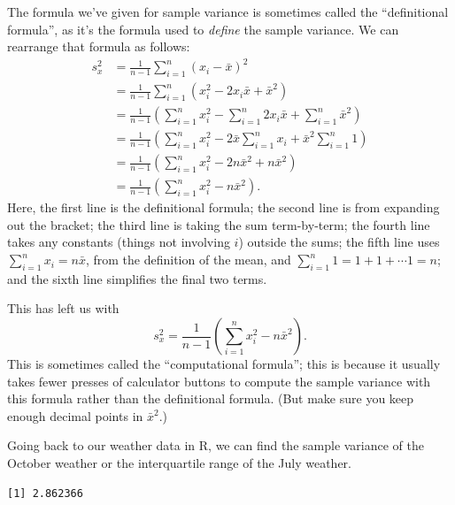 \documentclass[
  a4paper,
]{book}
\newenvironment{Shaded}{\begin{snugshade}}{\end{snugshade}}
\newcommand{\FunctionTok}[1]{\textcolor[rgb]{0.00,0.00,0.00}{#1}}
\newcommand{\NormalTok}[1]{#1}
\newcommand{\SpecialCharTok}[1]{\textcolor[rgb]{0.00,0.00,0.00}{#1}}
\theoremstyle{definition}
\theoremstyle{definition}
\theoremstyle{definition}
\theoremstyle{definition}
\theoremstyle{remark}
\begin{document}
The formula we've given for sample variance is sometimes called the ``definitional formula'', as it's the formula used to \emph{define} the sample variance. We can rearrange that formula as follows:
\begin{align*}
  s^2_x &= \frac{1}{n-1} \sum_{i=1}^n (x_i - \bar x)^2 \\
      &= \frac{1}{n-1} \sum_{i=1}^n (x_i^2 - 2x_i\bar x + \bar x^2) \\
      &= \frac{1}{n-1}\left(\sum_{i=1}^nx_i^2 - \sum_{i=1}^n 2x_i\bar x + \sum_{i=1}^n\bar x^2 \right) \\
      &= \frac{1}{n-1} \left(\sum_{i=1}^n x_i^2 - 2\bar x \sum_{i=1}^n x_i + \bar x^2 \sum_{i=1}^n 1 \right) \\
      &= \frac{1}{n-1} \left(\sum_{i=1}^n x_i^2 - 2n\bar x^2 + n\bar x^2 \right) \\
      &= \frac{1}{n-1} \left(\sum_{i=1}^n x_i^2 -  n\bar x^2 \right) .
\end{align*}
Here, the first line is the definitional formula; the second line is from expanding out the bracket; the third line is taking the sum term-by-term; the fourth line takes any constants (things not involving \(i\)) outside the sums; the fifth line uses \(\sum_{i=1}^n x_i = n\bar x\), from the definition of the mean, and \(\sum_{i=1}^n 1 = 1 + 1 + \cdots 1 = n\); and the sixth line simplifies the final two terms.

This has left us with
\[ s^2_x = \frac{1}{n-1} \left(\sum_{i=1}^n x_i^2 -  n\bar x^2 \right) . \]
This is sometimes called the ``computational formula''; this is because it usually takes fewer presses of calculator buttons to compute the sample variance with this formula rather than the definitional formula. (But make sure you keep enough decimal points in \(\bar x^2\).)

Going back to our weather data in R, we can find the sample variance of the October weather or the interquartile range of the July weather.

\begin{Shaded}
\end{Shaded}

\begin{verbatim}
[1] 2.862366
\end{verbatim}

\begin{Shaded}
\end{Shaded}
\end{document}
